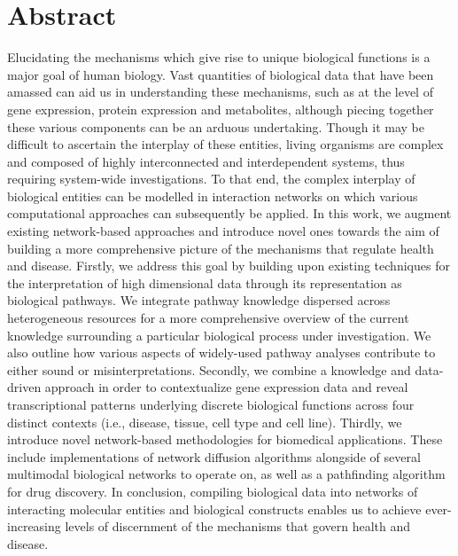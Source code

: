 \chapter*{Abstract}

Elucidating the mechanisms which give rise to unique biological functions is a major goal of human biology. Vast quantities of biological data that have been amassed can aid us in understanding these mechanisms, such as at the level of gene expression, protein expression and metabolites, although piecing together these various components can be an arduous undertaking. Though it may be difficult to ascertain the interplay of these entities, living organisms are complex and composed of highly interconnected and interdependent systems, thus requiring system-wide investigations. To that end, the complex interplay of biological entities can be modelled in interaction networks on which various computational approaches can subsequently be applied. In this work, we augment existing network-based approaches and introduce novel ones towards the aim of building a more comprehensive picture of the mechanisms that regulate health and disease. Firstly, we address this goal by building upon existing techniques for the interpretation of high dimensional data through its representation as biological pathways. We integrate pathway knowledge dispersed across heterogeneous resources for a more comprehensive overview of the current knowledge surrounding a particular biological process under investigation. We also outline how various aspects of widely-used pathway analyses contribute to either sound or misinterpretations. Secondly, we combine a knowledge and data-driven approach in order to contextualize gene expression data and reveal transcriptional patterns underlying discrete biological functions across four distinct contexts (i.e., disease, tissue, cell type and cell line). Thirdly, we introduce novel network-based methodologies for biomedical applications. These include implementations of network diffusion algorithms alongside of several multimodal biological networks to operate on, as well as a pathfinding algorithm for drug discovery. In conclusion, compiling biological data into networks of interacting molecular entities and biological constructs enables us to achieve ever-increasing levels of discernment of the mechanisms that govern health and disease.


